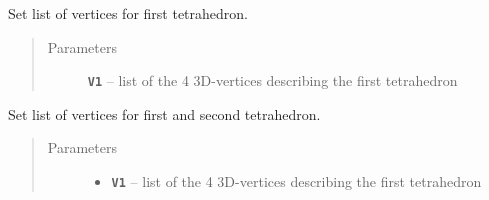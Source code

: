 \documentclass[letterpaper,10pt,english]{sphinxmanual}
\begin{document}
\begin{fulllineitems}

\begin{fulllineitems}
\label{pk_src.collision_tet_tet:pk_src.collision_tet_tet.Collision_tet_tet.separating_plane_faceB_1}
\end{fulllineitems}


\begin{fulllineitems}
\label{pk_src.collision_tet_tet:pk_src.collision_tet_tet.Collision_tet_tet.separating_plane_faceB_2}
\end{fulllineitems}


\begin{fulllineitems}
\label{pk_src.collision_tet_tet:pk_src.collision_tet_tet.Collision_tet_tet.setV1}
Set list of vertices for first tetrahedron.
\begin{quote}\begin{description}
\item[{Parameters}] \leavevmode
\textbf{\texttt{V1}} -- list of the 4 3D-vertices describing the first tetrahedron

\end{description}\end{quote}

\end{fulllineitems}


\begin{fulllineitems}
\label{pk_src.collision_tet_tet:pk_src.collision_tet_tet.Collision_tet_tet.setV1V2}
Set list of vertices for first and second tetrahedron.
\begin{quote}\begin{description}
\item[{Parameters}] \leavevmode\begin{itemize}
\item {} 
\textbf{\texttt{V1}} -- list of the 4 3D-vertices describing the first tetrahedron


\end{itemize}
\end{description}
\end{quote}
\end{fulllineitems}
\end{fulllineitems}
\end{document}
